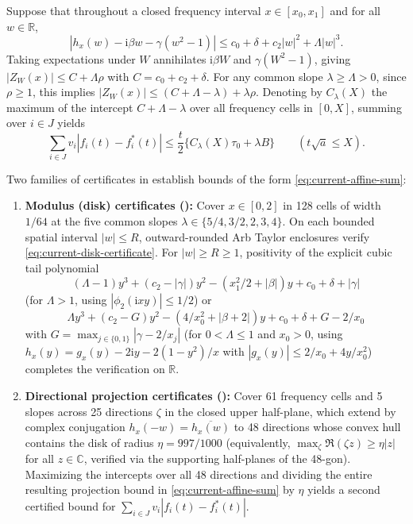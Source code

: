 \documentclass[11pt]{article}
\numberwithin{equation}{section}
\theoremstyle{remark}
\newcommand{\R}{\mathbb R}
\newcommand{\ii}{\mathrm i}
\begin{document}
Suppose that throughout a closed frequency interval $x\in[x_0,x_1]$ and for
all $w\in\R$,
\begin{equation}\label{eq:current-disk-certificate}
 |h_x(w)-\ii \beta w-\gamma(w^2-1)|
       \le c_0+\delta+c_2|w|^2+\Lambda|w|^3.
\end{equation}
Taking expectations under $W$ annihilates $\ii\beta W$ and $\gamma(W^2-1)$,
giving $|Z_W(x)|\le C+\Lambda\rho$ with $C=c_0+c_2+\delta$. For any common
slope $\lambda\ge\Lambda>0$, since $\rho\ge1$, this implies
$|Z_W(x)|\le(C+\Lambda-\lambda)+\lambda\rho$. Denoting by $C_\lambda(X)$ the
maximum of the intercept $C+\Lambda-\lambda$ over all frequency cells in
$[0,X]$, summing over $i\in J$ yields
\begin{equation}\label{eq:current-affine-sum}
 \sum_{i\in J} v_i|f_i(t)-f_i^*(t)|
 \le\frac t2\{C_\lambda(X)\tau_0+\lambda B\}
 \qquad(t\sqrt a\le X).
\end{equation}

Two families of certificates in  establish bounds
of the form \eqref{eq:current-affine-sum}:
\begin{enumerate}[label=(\roman*),leftmargin=2em]
\item \textbf{Modulus (disk) certificates ():} Cover $x\in[0,2]$
in 128 cells of width $1/64$ at the five common slopes
$\lambda\in\{5/4,3/2,2,3,4\}$. On each bounded spatial interval $|w|\le R$,
outward-rounded Arb Taylor enclosures verify \eqref{eq:current-disk-certificate}.
For $|w|\ge R\ge1$, positivity of the explicit cubic tail polynomial
\[
 (\Lambda-1)y^3+(c_2-|\gamma|)y^2-(x_1^2/2+|\beta|)y+c_0+\delta+|\gamma|
\]
(for $\Lambda>1$, using $|\phi_2(\ii xy)|\le1/2$) or
\[
 \Lambda y^3+(c_2-G)y^2-(4/x_0^2+|\beta+2|)y+c_0+\delta+G-2/x_0
\]
with $G=\max_{j\in\{0,1\}}|\gamma-2/x_j|$ (for $0<\Lambda\le1$ and $x_0>0$, using
$h_x(y)=g_x(y)-2\ii y-2(1-y^2)/x$ with $|g_x(y)|\le2/x_0+4y/x_0^2$)
completes the verification on $\R$.
\item \textbf{Directional projection certificates ():}
Cover 61 frequency cells and 5 slopes across 25 directions $\zeta$ in the
closed upper half-plane, which extend by complex conjugation
$h_x(-w)=\overline{h_x(w)}$ to 48 directions whose convex hull contains the
disk of radius $\eta=997/1000$ (equivalently, $\max_\zeta\Re(\zeta z)\ge\eta|z|$
for all $z\in\mathbb C$, verified via the supporting half-planes of the
48-gon). Maximizing the intercepts over all 48 directions and dividing the
entire resulting projection bound in \eqref{eq:current-affine-sum} by $\eta$
yields a second certified bound for $\sum_{i\in J}v_i|f_i(t)-f_i^*(t)|$.
\end{enumerate}
\end{document}
